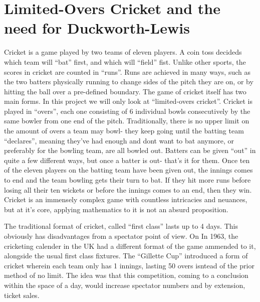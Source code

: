 \section{Limited-Overs Cricket and the need for Duckworth-Lewis}
Cricket is a game played by two teams of eleven players. A coin toss decideds which team will ``bat'' first, and which will ``field'' fist. Unlike other sports, the scores in cricket are counted in ``runs''. Runs are achieved
in many ways, such as the two batters physically running to change sides of the pitch they are on, or by hitting the ball over a pre-defined boundary. The game of cricket itself has two main forms. In this project we will 
only look at ``limited-overs cricket''. Cricket is played in ``overs'', each one consisting of 6 individual bowls consecutively by the same bowler from one end of the pitch. Traditionally, there is no upper limit on the 
amount of overs a team may bowl- they keep going until the batting team ``declares'', meaning they've had enough and dont want to bat anymore, or preferably for the bowling team, are all bowled out. 
Batters can be given ``out'' in quite a few different ways, but once a batter is out- that's it for them. Once ten of the eleven players on the batting team have been given out, the innings comes to end and the team bowling 
gets their turn to bat. If they hit more runs before losing all their ten wickets or before the innings comes to an end, then they win. Cricket is an immensely complex game with countless intricacies and neuances, but at 
it's core, applying mathematics to it is not an absurd proposition. 

The traditional format of cricket, called ``first class'' lasts up to 4 days. This obviously has disadvantages from a spectator point of view. On
In 1963, the cricketing calender in the UK had a different format of the game ammended to it, alongside the usual first class fixtures.
The ``Gillette Cup'' introduced a form of cricket wherein each team only has 1 innings, lasting 50 overs isntead of the prior method of no limit. The idea was 
that this competition, coming to a conclusion within the space of a day, would increase spectator numbers and by extension,
ticket sales.\\


